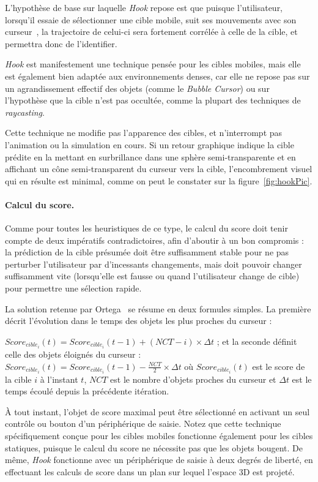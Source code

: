 	L'hypothèse de base sur laquelle \emph{Hook} repose est que puisque l'utilisateur, lorsqu'il essaie de sélectionner une cible mobile, \og suit \fg{} ses mouvements avec son curseur~\cite{hasan2011comet}, la trajectoire de celui-ci sera fortement corrélée à celle de la cible, et permettra donc de l'identifier.
	
	\emph{Hook} est manifestement une technique pensée pour les cibles mobiles, mais elle est également bien adaptée aux environnements denses, car elle ne repose pas sur un agrandissement effectif des objets (comme le \emph{Bubble Cursor}) ou sur l'hypothèse que la cible n'est pas occultée, comme la plupart des techniques de \emph{raycasting}.
	
	Cette technique ne modifie pas l'apparence des cibles, et n'interrompt pas l'animation ou la simulation en cours. Si un retour graphique indique la cible prédite en la mettant en surbrillance dans une sphère semi-transparente et en affichant un cône semi-transparent du curseur vers la cible, l'encombrement visuel qui en résulte est minimal, comme on peut le constater sur la figure~\ref{fig:hookPic}.
	
	\paragraph{Calcul du score.}
	Comme pour toutes les heuristiques de ce type, le calcul du score doit tenir compte de deux impératifs contradictoires, afin d'aboutir à un bon compromis : la prédiction de la cible présumée doit être suffisamment stable pour ne pas perturber l'utilisateur par d'incessants changements, mais doit pouvoir changer suffisamment vite (lorsqu'elle est fausse ou quand l'utilisateur change de cible) pour permettre une sélection rapide.
	
	La solution retenue par Ortega~\cite{ortega2013hook} se résume en deux formules simples. La première décrit l'évolution dans le temps des objets les plus proches du curseur :
	
	$Score_{cible_{i}}(t) = Score_{cible_{i}}(t-1) + (NCT - i) \times \Delta{}t$ ; et la seconde définit celle des objets éloignés du curseur : $Score_{cible_{i}}(t) = Score_{cible_{i}}(t-1) - \frac{NCT}{2} \times \Delta{}t$ où $Score_{cible_{i}}(t)$ est le score de la cible $i$ à l'instant $t$, $NCT$ est le nombre d'objets proches du curseur et $\Delta{}t$ est le temps écoulé depuis la précédente itération.
	
	À tout instant, l'objet de score maximal peut être sélectionné en activant un seul contrôle ou bouton d'un périphérique de saisie. Notez que cette technique spécifiquement conçue pour les cibles mobiles fonctionne également pour les cibles statiques, puisque le calcul du score ne nécessite pas que les objets bougent. De même, \emph{Hook} fonctionne avec un périphérique de saisie à deux degrés de liberté, en effectuant les calculs de score dans un plan sur lequel l'espace 3D est projeté.
	
